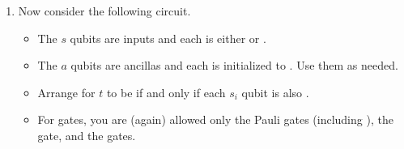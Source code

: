 \documentclass[12pt]{article}
\begin{document}
\begin{enumerate}[font=\bfseries]
\item{} Now consider the following circuit.
\begin{itemize}
    \item The $s$ qubits are inputs and each is either \QZero{} or \QOne{}.
    \item The $a$ qubits are ancillas and each is initialized to \QZero{}.  Use them as needed.
    \item Arrange for $t$ to be \QOne{} if and only if each $s_{i}$ qubit is also \QOne{}.  
    \item For gates, you are (again) allowed only the
    Pauli gates (including \Hadamard{}), the  gate, and the  gates.
\end{itemize}


\end{enumerate}
\end{document}
